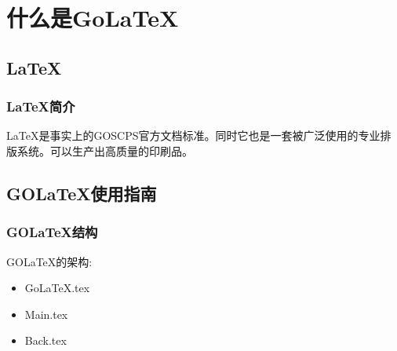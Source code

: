 \chapter{什么是Go\LaTeX{}}
\section{\LaTeX{}}
\subsection{\LaTeX{}简介}

\LaTeX{}是事实上的GOSCPS官方文档标准。同时它也是一套被广泛使用的专业排版系统。可以生产出高质量的印刷品。

\section{GO\LaTeX{}使用指南}
\subsection{GO\LaTeX{}结构}
GO\LaTeX{}的架构:\newline{}

\begin{itemize}
    \item Go\LaTeX{}.tex
    \item Main.tex
    \item Back.tex
\end{itemize}